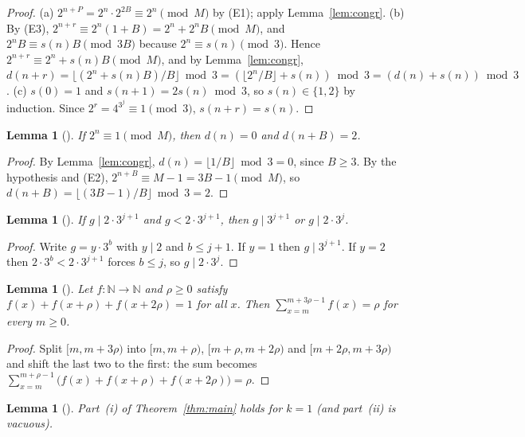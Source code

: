 \documentclass[11pt]{amsart}
\theoremstyle{plain}
\newtheorem{lemma}[theorem]{Lemma}
\theoremstyle{definition}
\newcommand{\N}{\mathbb{N}}
\begin{document}
\begin{proof}
(a) $2^{n+P}=2^n\cdot2^{2B}\equiv2^n\pmod M$ by (E1); apply Lemma~\ref{lem:congr}.
(b) By (E3), $2^{n+r}\equiv 2^n(1+B)=2^n+2^nB\pmod M$, and $2^nB\equiv s(n)B\pmod{3B}$ because $2^n\equiv s(n)\pmod 3$. Hence $2^{n+r}\equiv 2^n+s(n)B\pmod M$, and by Lemma~\ref{lem:congr}, $d(n+r)=\lfloor (2^n+s(n)B)/B\rfloor \bmod 3=(\lfloor2^n/B\rfloor+s(n))\bmod 3=(d(n)+s(n))\bmod 3$.
(c) $s(0)=1$ and $s(n+1)=2s(n)\bmod 3$, so $s(n)\in\{1,2\}$ by induction. Since $2^r=4^{3^j}\equiv1\pmod 3$, $s(n+r)=s(n)$.
\end{proof}

\begin{lemma}[]\label{lem:flip}
If $2^n\equiv1\pmod M$, then $d(n)=0$ and $d(n+B)=2$.
\end{lemma}

\begin{proof}
By Lemma~\ref{lem:congr}, $d(n)=\lfloor1/B\rfloor \bmod 3=0$, since $B\ge3$. By the hypothesis and (E2), $2^{n+B}\equiv M-1=3B-1\pmod M$, so $d(n+B)=\lfloor(3B-1)/B\rfloor \bmod 3=2$.
\end{proof}

\begin{lemma}[]\label{lem:dvd}
If $g\mid 2\cdot3^{j+1}$ and $g<2\cdot3^{j+1}$, then $g\mid 3^{j+1}$ or $g\mid 2\cdot3^j$.
\end{lemma}

\begin{proof}
Write $g=y\cdot3^b$ with $y\mid2$ and $b\le j+1$. If $y=1$ then $g\mid3^{j+1}$. If $y=2$ then $2\cdot3^b<2\cdot3^{j+1}$ forces $b\le j$, so $g\mid2\cdot3^j$.
\end{proof}

\begin{lemma}[]\label{lem:count}
Let $f:\N\to\N$ and $\rho\ge0$ satisfy $f(x)+f(x+\rho)+f(x+2\rho)=1$ for all $x$. Then $\sum_{x=m}^{m+3\rho-1}f(x)=\rho$ for every $m\ge0$.
\end{lemma}

\begin{proof}
Split $[m,m+3\rho)$ into $[m,m+\rho)$, $[m+\rho,m+2\rho)$ and $[m+2\rho,m+3\rho)$ and shift the last two to the first: the sum becomes $\sum_{x=m}^{m+\rho-1}\bigl(f(x)+f(x+\rho)+f(x+2\rho)\bigr)=\rho$.
\end{proof}

\begin{lemma}[]\label{lem:col1}
Part~(i) of Theorem~\ref{thm:main} holds for $k=1$ (and part~(ii) is vacuous).
\end{lemma}
\end{document}
